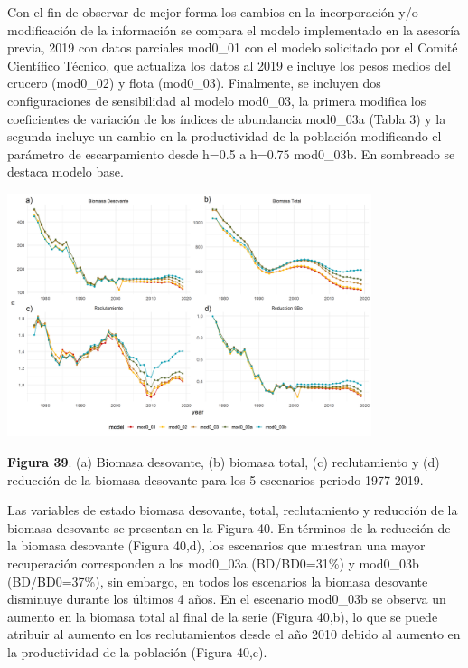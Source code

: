 \documentclass[
  spanish,
]{article}
\begin{document}
Con el fin de observar de mejor forma los cambios en la incorporación
y/o modificación de la información se compara el modelo implementado en
la asesoría previa, 2019 con datos parciales mod0\_01 con el modelo
solicitado por el Comité Científico Técnico, que actualiza los datos al
2019 e incluye los pesos medios del crucero (mod0\_02) y flota
(mod0\_03). Finalmente, se incluyen dos configuraciones de sensibilidad
al modelo mod0\_03, la primera modifica los coeficientes de variación de
los índices de abundancia mod0\_03a (Tabla 3) y la segunda incluye un
cambio en la productividad de la población modificando el parámetro de
escarpamiento desde h=0.5 a h=0.75 mod0\_03b. En sombreado se destaca
modelo base.

\begin{center}
\includegraphics[width=0.8\textwidth]{Figuras/Figura_39.png}
\end{center}

\small \textbf{Figura 39}. (a) Biomasa desovante, (b) biomasa total, (c)
reclutamiento y (d) reducción de la biomasa desovante para los 5
escenarios periodo 1977-2019. \vspace{0.5cm} \normalsize

Las variables de estado biomasa desovante, total, reclutamiento y
reducción de la biomasa desovante se presentan en la Figura 40. En
términos de la reducción de la biomasa desovante (Figura 40,d), los
escenarios que muestran una mayor recuperación corresponden a los
mod0\_03a (BD/BD0=31\%) y mod0\_03b (BD/BD0=37\%), sin embargo, en todos
los escenarios la biomasa desovante disminuye durante los últimos 4
años. En el escenario mod0\_03b se observa un aumento en la biomasa
total al final de la serie (Figura 40,b), lo que se puede atribuir al
aumento en los reclutamientos desde el año 2010 debido al aumento en la
productividad de la población (Figura 40,c).
\end{document}
